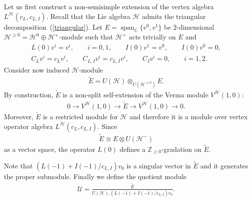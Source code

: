 \documentclass[pdftex]{sigma}
\numberwithin{equation}{section}
\newcommand{\Z}{\mathbb Z}
\newcommand{\C}{\mathbb C}
\newcommand{\HVir}{\mathcal H}
\begin{document}
Let us f\/irst construct a non-semisimple extension of the vertex algebra $L^{\HVir} (c_L, c_{L,I})$. Recall that the Lie algebra $\HVir$ admits the triangular decomposition~(\ref{triangular}). Let $E=\operatorname{span}_{\C} \{ v^{0}, v^{1} \}$ be $2$-dimensional $\HVir^{\ge 0} = \HVir^{0} \oplus \HVir^{+}$-module such that $\HVir ^+ $ acts trivially on $E$ and
\begin{gather*}
L(0) v^{i} = v^{i} , \qquad i=0,1, \qquad I(0) v^1 = v^0, \qquad I(0) v^0 = 0, \\
C_L v^{i} = c_L v^{i}, \qquad C_{L,I} v^{i} = c_{L,I} v^{i}, \qquad C_I v^{i} = 0, \qquad i=1,2.
\end{gather*}
Consider now induced $\HVir$-module
\begin{gather*}
\widetilde E = U(\HVir) \otimes _{U (\HVir ^{\ge 0} )} E.
\end{gather*}
By construction, $\widetilde E$ is a non-split self-extension of the Verma module $V^{\HVir} (1,0)$:
\begin{gather*}
0 \rightarrow V^{\HVir} (1,0) \rightarrow \widetilde E \rightarrow V^{\HVir} (1,0 ) \rightarrow 0.
\end{gather*}
Moreover, $\widetilde E$ is a restricted module for $\HVir$ and therefore it is a module over vertex operator algebra $L^{\HVir} (c_L, c_{L,I})$. Since
\begin{gather*}
\widetilde E \cong E \otimes U(\HVir^{-})
\end{gather*}
as a vector space, the operator $L(0)$ def\/ines a $\Z_{\ge 0}$-gradation on $\widetilde E$.

Note that $ (L(-1) + I(-1) / c_{L,I} ) v_0$ is a singular vector in $\widetilde E$ and it generates the proper submodule. Finally we def\/ine the quotient module
\begin{gather*}
\mathcal U = \frac{ \widetilde E} {U(\HVir) . (L(-1) + I(-1) / c_{L,I} ) v_0}.
\end{gather*}
\end{document}
